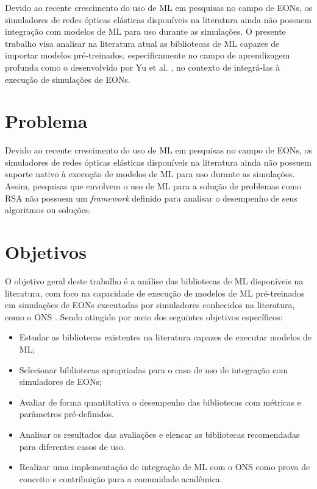 Devido ao recente crescimento do uso de ML em pesquisas no campo de EONs, os simuladores de redes ópticas elásticas disponíveis na literatura ainda não possuem integração com modelos de ML para uso durante as simulações. O presente trabalho visa analisar na literatura atual as bibliotecas de ML capazes de importar modelos pré-treinados, especificamente no campo de aprendizagem profunda como o desenvolvido por Yu et al. \cite{eon_ml_rsa_dl_2019}, no contexto de integrá-las à execução de simulações de EONs.

\section{Problema}
\label{intro-problem}

Devido ao recente crescimento do uso de ML em pesquisas no campo de EONs, os simuladores de redes ópticas elásticas disponíveis na literatura ainda não possuem suporte nativo à execução de modelos de ML para uso durante as simulações. Assim, pesquisas que envolvem o uso de ML para a solução de problemas como RSA não possuem um \textit{framework} definido para analisar o desempenho de seus algoritmos ou soluções.

\section{Objetivos}
\label{intro-goals}

O objetivo geral deste trabalho é a análise das bibliotecas de ML disponíveis na literatura, com foco na capacidade de execução de modelos de ML pré-treinados em simulações de EONs executadas por simuladores conhecidos na literatura, como o ONS \cite{costa2016ons}. Sendo atingido por meio dos seguintes objetivos específicos:

\begin{itemize}
  \item Estudar as bibliotecas existentes na literatura capazes de executar modelos de ML;
  \item Selecionar bibliotecas apropriadas para o caso de uso de integração com simuladores de EONs;
  \item Avaliar de forma quantitativa o desempenho das bibliotecas com métricas e parâmetros pré-definidos.
  \item Analisar os resultados das avaliações e elencar as bibliotecas recomendadas para diferentes casos de uso.
  \item Realizar uma implementação de integração de ML com o ONS como prova de conceito e contribuição para a comunidade acadêmica.
\end{itemize}


